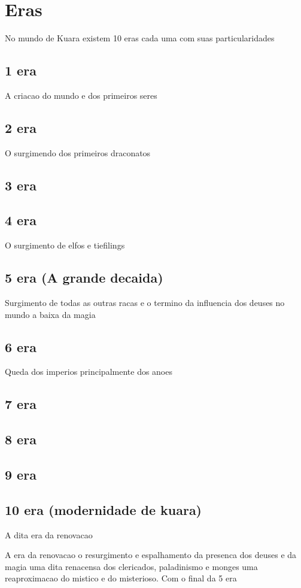 \documentclass{book}
\begin{document}
\chapter{Eras}
No mundo de Kuara existem 10 eras cada uma com suas particularidades

\section*{1 era}
A criacao do mundo  e dos primeiros seres
\section*{2 era}
O surgimendo dos primeiros draconatos 
\section*{3 era}
\section*{4 era}
O surgimento de elfos e tiefilings
\section*{5 era (A grande decaida)}
Surgimento de todas as outras racas
e o termino da influencia dos deuses no mundo a baixa da magia
\section*{6 era}
Queda dos imperios principalmente dos anoes
\section*{7 era}
\section*{8 era}
\section*{9 era}
\section*{10 era (modernidade de kuara)}
A dita era da renovacao 

A era da renovacao o resurgimento e espalhamento da presenca dos deuses e da magia uma dita 
renacensa dos clericados, paladinismo e monges uma reaproximacao do mistico e do misterioso.
Com o final da 5 era 
\end{document}
